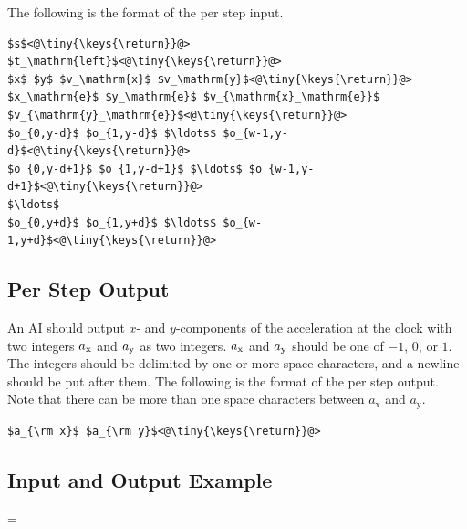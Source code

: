 \documentclass[11pt]{article}
\begin{document}
\noindent
The following is the format of the per step input.

\begin{lstlisting}
$s$<@\tiny{\keys{\return}}@>
$t_\mathrm{left}$<@\tiny{\keys{\return}}@>
$x$ $y$ $v_\mathrm{x}$ $v_\mathrm{y}$<@\tiny{\keys{\return}}@>
$x_\mathrm{e}$ $y_\mathrm{e}$ $v_{\mathrm{x}_\mathrm{e}}$ $v_{\mathrm{y}_\mathrm{e}}$<@\tiny{\keys{\return}}@>
$o_{0,y-d}$ $o_{1,y-d}$ $\ldots$ $o_{w-1,y-d}$<@\tiny{\keys{\return}}@>
$o_{0,y-d+1}$ $o_{1,y-d+1}$ $\ldots$ $o_{w-1,y-d+1}$<@\tiny{\keys{\return}}@>
$\ldots$
$o_{0,y+d}$ $o_{1,y+d}$ $\ldots$ $o_{w-1,y+d}$<@\tiny{\keys{\return}}@>
\end{lstlisting}

\subsection{Per Step Output}\label{sec:output_step}
An AI should output $x$- and $y$-components of the
acceleration at the clock with two integers $a_{\rm x}$ and $a_{\rm
  y}$ as two integers.
$a_{\rm x}$ and $a_{\rm y}$ should be one of $-1$, $0$, or $1$.
The integers should be delimited by one or more space characters, and a newline should be put after them.
The following is the format of the per step output.
Note that there can be more than one space characters between $a_\mathrm{x}$ and $a_\mathrm{y}$.

\begin{lstlisting}
$a_{\rm x}$ $a_{\rm y}$<@\tiny{\keys{\return}}@>
\end{lstlisting}

\subsection{Input and Output Example}

\newlength{}
{}=\parindent
\end{document}
